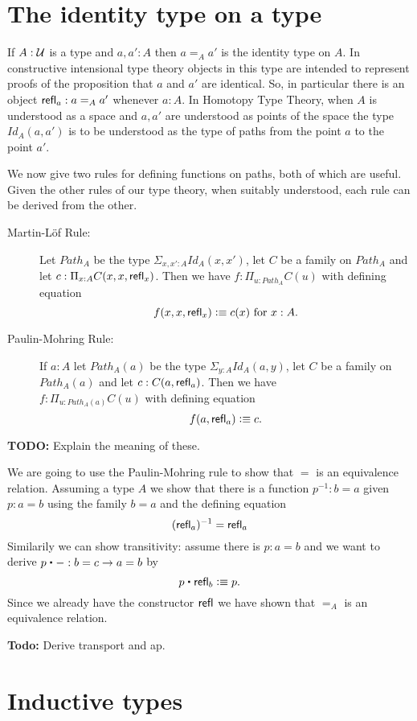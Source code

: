 {\section{The identity type on a type}
\label{sec:identity-types}

If $A:\mathcal{U}$ is a type and $a,a':A$ then $a =_A a'$ is the identity type on $A$.  
In constructive intensional type theory objects in this type are
intended to represent proofs of the proposition that $a$ and $a'$ are
identical.  So, in particular there is an object $\mathsf{refl}_{a}: a =_A a'$ whenever $a:A$.  In Homotopy Type Theory, when $A$ is understood as a space and $a,a'$ are understood as points of the space the type $Id_A(a,a')$ is to be understood as the type of paths from the point $a$ to the point $a'$.

We now give two rules for defining functions on paths, both of which are useful.  Given the other rules of our type theory, when suitably understood, each rule can be derived from the other. 

\begin{description}
\item[Martin-L\"{o}f Rule:] Let $Path_A$ be the type $\Sigma_{x,x':A}Id_A(x,x')$, let $C$ be a family on $Path_A$ and let $c:\Pi_{x:A}C(x,x,\mathsf{refl}_{x})$.  Then we have $f:\Pi_{u:Path_A}C(u)$ with defining equation
  \[ f(x,x,\mathsf{refl}_{x})\vcentcolon\equiv c(x)\mbox{ for } x:A.\]
\item[Paulin-Mohring Rule:] If $a:A$ let $Path_A(a)$ be the type $\Sigma_{y:A}Id_A(a,y)$, let $C$ be a family on $Path_A(a)$ and let $c:C(a,\mathsf{refl}_{a})$. Then we have\\ $f:\Pi_{u:Path_A(a)}C(u)$ with defining equation
    \[ f(a,\mathsf{refl}_{a})\vcentcolon\equiv c.\]
\end{description}

\textbf{TODO:} Explain the meaning of these.

We are going to use the Paulin-Mohring rule to show that $=$ is an
equivalence relation. Assuming a type $A$ we show that there is a function
$p^{-1} : b = a$ given $p : a = b$ using the family $b = a$ and
the defining equation
\[ (\mathsf{refl}_{a})^{-1} = \mathsf{refl}_{a} \]
Similarily we can show transitivity: assume there is $p : a = b$ and
we want to derive $p \ct - : b = c \to a = b$ by
\[ p \ct \refl{b} \defeq p.\]
Since we already have the constructor $\mathsf{refl}_{}$ we have shown that $=_A$
is an equivalence relation. 


\textbf{Todo:} Derive transport and ap.

\section{Inductive types}
\label{sec:inductive-types}

}
